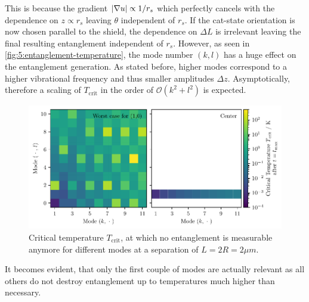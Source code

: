 This is because the gradient $\left\lvert\nabla u\right\rvert \propto 1/r_s$ which perfectly cancels with the dependence on $z \propto r_s$ leaving $\theta$ independent of $r_s$. 
If the cat-state orientation is now chosen parallel to the shield, the dependence on $\Delta L$ is irrelevant leaving the final resulting entanglement independent of $r_s$.
However, as seen in \cref{fig:5:entanglement-temperature}, the mode number $(k,l)$ has a huge effect on the entanglement generation. As stated before, higher modes correspond to a higher vibrational frequency and thus smaller amplitudes $\Delta z$.
Asymptotically, therefore a scaling of $T_\mathrm{crit}$ in the order of $\mathcal{O}(k^2 + l^2)$ is expected.
\begin{figure}[!htbp]
  \centering
  \includegraphics[width=\textwidth]{./../figures/vibrations/T-crit-modes.pdf}
  \caption{Critical temperature $T_\mathrm{crit}$, at which no entanglement is measurable anymore for different modes at a separation of $L = 2R = 2\si{\mu m}$.}
  \label{fig:5:T-crit-modes}
\end{figure}
It becomes evident, that only the first couple of modes are actually relevant as all others do not destroy entanglement up to temperatures much higher than necessary.



